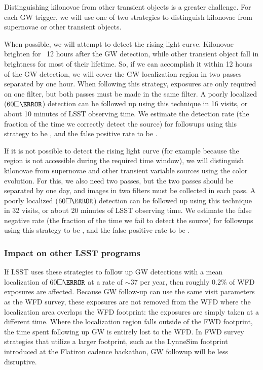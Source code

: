 Distinguishing kilonovae from other transient objects is a greater challenge. For each GW trigger, we will use one of two strategies to distinguish kilonovae from supernovae or other transient objects.

When possible, we will attempt to detect the rising light curve. Kilonovae brighten for ~12 hours after the GW detection, while other transient object fall in brightness for most of their lifetime. So, if we can accomplish it within 12 hours of the GW detection, we will cover the GW localization region in two passes separated by one hour. When following this strategy, exposures are only required on one filter, but both passes must be made in the same filter. A poorly localized ($60 \square\degree$) detection can be followed up using this technique in 16 visits, or about 10 minutes of LSST observing time. We estimate the detection rate (the fraction of the time we correctly detect the source) for followups using this strategy to be \todo{}, and the false positive rate to be \todo{}.

If it is not possible to detect the rising light curve (for example because the region is not accessible during the required time window), we will distinguish kilonovae from supernovae and other transient variable sources using the color evolution. For this, we also need two passes, but the two passes should be separated by one day, and images in two filters must be collected in each pass. A poorly localized ($60 \square\degree$) detection can be followed up using this technique in 32 visits, or about 20 minutes of LSST observing time. We estimate the false negative rate (the fraction of the time we fail to detect the source) for followups using this strategy to be \todo{}, and the false positive rate to be \todo{}.


\subsubsection{Impact on other LSST programs}

If LSST uses these strategies to follow up GW detections with a mean localization of $60\square\degree$ at a rate of $\sim 37$ per year, then roughly $0.2\%$ of WFD exposures are affected. Because GW follow-up can use the same visit parameters as the WFD survey, these exposures are not removed from the WFD where the localization area overlaps the WFD footprint: the exposures are simply taken at a different time. Where the localization region falls outside of the FWD footprint, the time spent following up GW is entirely lost to the WFD. In FWD survey strategies that utilize a larger footprint, such as the LynneSim footprint introduced at the Flatiron cadence hackathon, GW followup will be less disruptive. 

